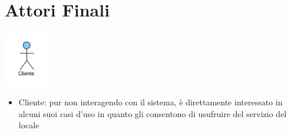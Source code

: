 \section{Attori Finali}
\begin{centering}
	\includegraphics[width=0.15\textwidth]{Immagini/AttoriFinali.png}
\end{centering}

\begin{itemize}
	\item Cliente: pur non interagendo con il sistema, è direttamente interessato in alcuni suoi casi d'uso in quanto gli consentono di usufruire del servizio del locale
\end{itemize}

